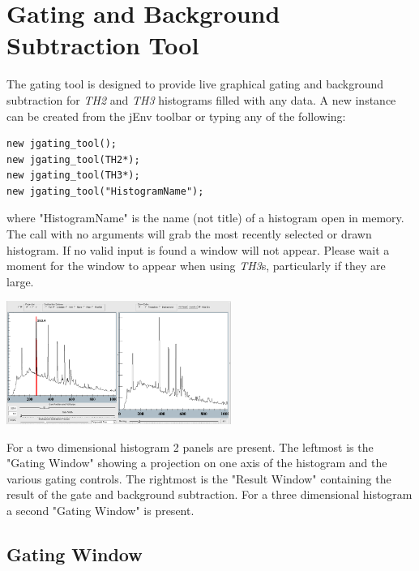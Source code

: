 \documentclass[a4paper,10pt]{article}
\begin{document}
\newpage
\section{Gating and Background Subtraction Tool}
The gating tool is designed to provide live graphical gating and background subtraction for \textit{TH2} and \textit{TH3} histograms filled with any data. 
A new instance can be created from the jEnv toolbar or typing any of the following:
\lstset{language=C++}
\begin{lstlisting}
new jgating_tool();
new jgating_tool(TH2*);
new jgating_tool(TH3*);
new jgating_tool("HistogramName");
\end{lstlisting}
where "HistogramName" is the name (not title) of a histogram open in memory. The call with no arguments will grab the most recently selected or drawn histogram. If no valid input is found a window will not appear. Please wait a moment for the window to appear when using \textit{TH3}s, particularly if they are large.
\begin{center}
\includegraphics[width=0.55\textwidth]{toolA.png}
\end{center}

For a two dimensional histogram 2 panels are present. The leftmost is the "Gating Window" showing a projection on one axis of the histogram and the various gating controls. The rightmost is the "Result Window" containing the result of the gate and background subtraction.
For a three dimensional histogram a second "Gating Window" is present.

\subsection{Gating Window}
\end{document}

